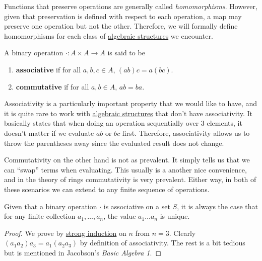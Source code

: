 Functions that preserve operations are generally called \textit{homomorphisms}. However, given that preservation is defined with respect to each operation, a map may preserve one operation but not the other. Therefore, we will formally define homomorphisms for each class of \hyperref[def:algebraic-structure]{algebraic structures} we encounter. 

\begin{definition}
  \label{def:commutative-associative-operations}
  A binary operation $\cdot : A \times A \to A$ is said to be 
  \begin{enumerate}
    \item \textbf{associative} if for all $a, b, c \in A$, $(ab)c = a(bc)$. 
    \item \textbf{commutative} if for all $a, b \in A$, $ab = ba$. 
  \end{enumerate}
\end{definition}

Associativity is a particularly important property that we would like to have, and it is quite rare to work with \hyperref[def:algebraic-structure]{algebraic structures} that don't have associativity. It basically states that when doing an operation sequentially over 3 elements, it doesn't matter if we evaluate $ab$ or $bc$ first. Therefore, associativity allows us to throw the parentheses away since the evaluated result does not change. 

Commutativity on the other hand is not as prevalent. It simply tells us that we can ``swap'' terms when evaluating. This usually is a another nice convenience, and in the theory of rings commutativity is very prevalent. Either way, in both of these scenarios we can extend to any finite sequence of operations.  

\begin{theorem}
  \label{thm:generalized-associativity}
  Given that a binary operation $\cdot$ is associative on a set $S$, it is always the case that for any finite collection $a_1, \ldots, a_n$, the value $a_1 \ldots a_n$ is unique. 
\end{theorem}
\begin{proof}
  We prove by \hyperref[st-thm:strong-induction-principle]{strong induction} on $n$ from $n = 3$. Clearly $(a_1 a_2) a_3 = a_1 (a_2 a_3)$ by definition of associativity. The rest is a bit tedious but is mentioned in Jacobson's \textit{Basic Algebra 1}. 
\end{proof}

